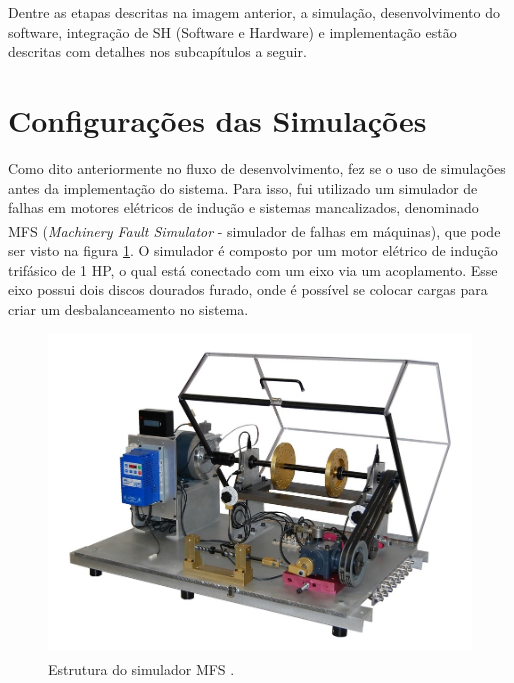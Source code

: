 Dentre as etapas descritas na imagem anterior, a simulação, desenvolvimento do software, integração de SH (Software e Hardware) e implementação
estão descritas com detalhes nos subcapítulos a seguir.


% 

\section{Configurações das Simulações}

Como dito anteriormente no fluxo de desenvolvimento, fez se o uso de simulações antes da implementação do sistema.
Para isso, fui utilizado um simulador de falhas em motores elétricos de indução e sistemas mancalizados, denominado
MFS \textsuperscript \textregistered (\textit{Machinery Fault Simulator} - simulador de falhas em máquinas), que pode ser visto na figura 
\ref{fig:real_plant}. O simulador é composto por um motor elétrico de indução trifásico de 1 HP, o qual está conectado com um eixo via um 
acoplamento. Esse eixo possui dois discos dourados furado, onde é possível se colocar cargas para criar um desbalanceamento no sistema.

\begin{figure}[H]
    \caption{Estrutura do simulador MFS \textsuperscript \textregistered.}
    \begin{center}
        \includegraphics[scale=.4]{metodologia/img/real_plant.jpeg}
    \end{center}
    \label{fig:real_plant}
\end{figure}

